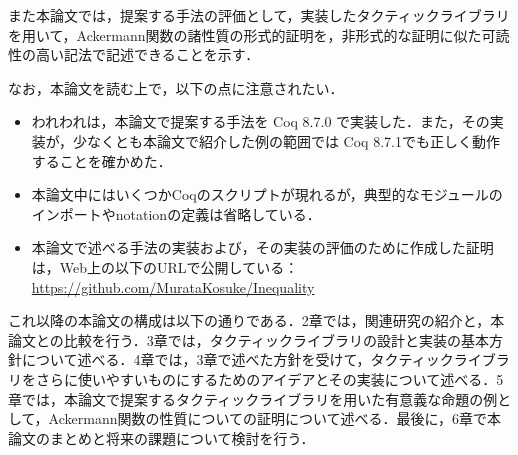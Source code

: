 \documentclass[submit]{ipsj}
\begin{document}
また本論文では，提案する手法の評価として，実装したタクティックライブラリを用いて，Ackermann関数の諸性質の形式的証明を，非形式的な証明に似た可読性の高い記法で記述できることを示す．

なお，本論文を読む上で，以下の点に注意されたい．
\begin{itemize}
\item われわれは，本論文で提案する手法を Coq 8.7.0 で実装した．また，その実装が，少なくとも本論文で紹介した例の範囲では Coq 8.7.1でも正しく動作することを確かめた．
\item 本論文中にはいくつかCoqのスクリプトが現れるが，典型的なモジュールのインポートやnotationの定義は省略している．
\item 本論文で述べる手法の実装および，その実装の評価のために作成した証明は，Web上の以下のURLで公開している： \url{https://github.com/MurataKosuke/Inequality}
\end{itemize}

これ以降の本論文の構成は以下の通りである．2章では，関連研究の紹介と，本論文との比較を行う．3章では，タクティックライブラリの設計と実装の基本方針について述べる．4章では，3章で述べた方針を受けて，タクティックライブラリをさらに使いやすいものにするためのアイデアとその実装について述べる．5章では，本論文で提案するタクティックライブラリを用いた有意義な命題の例として，Ackermann関数の性質についての証明について述べる．最後に，6章で本論文のまとめと将来の課題について検討を行う．


\end{document}
